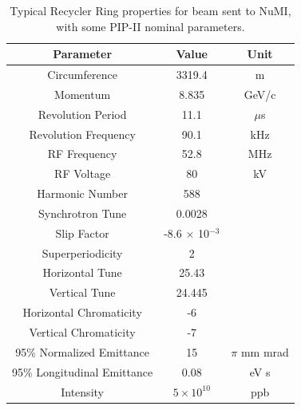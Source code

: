 \begin{table}[H]
   \centering
   \caption{Typical Recycler Ring properties for beam sent to NuMI, with some PIP-II nominal parameters.}
   \label{tab:rrparams}
   \begin{tabular}{@{}ccc@{}}
   \toprule
   \textbf{Parameter}          & \textbf{Value}                             & \textbf{Unit} \\ \midrule
   Circumference               & 3319.4                                     & m             \\
   Momentum                    & 8.835                                      & GeV/c         \\
   Revolution Period           & 11.1                                       & $\mu$s        \\
   Revolution Frequency        & 90.1                                       & kHz        \\
   RF Frequency                & 52.8                                       & MHz           \\
   RF Voltage                  & 80                                         & kV            \\
   Harmonic Number             & 588                                        &               \\
   Synchrotron Tune            & 0.0028                                     &               \\
   Slip Factor                 & -8.6 $\times$ 10$^{-3}$                    &               \\
   Superperiodicity            & 2                                          &               \\
   Horizontal Tune             & 25.43                                      &               \\
   Vertical Tune               & 24.445                                     &               \\
   Horizontal Chromaticity     & -6                                         &               \\
   Vertical Chromaticity       & -7                                         &               \\
   95\% Normalized Emittance   & 15                                         & $\pi$ mm mrad \\
   95\% Longitudinal Emittance & 0.08                                       & eV s          \\
   Intensity                   & $5\times10^{10}$                           & ppb           \\

\end{tabular}
\end{table}
